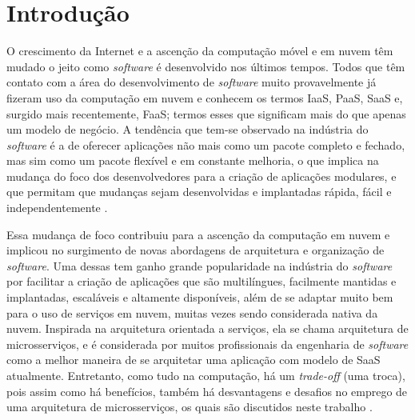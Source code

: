 \chapter{Introdução}\label{chapter-introducao}

O crescimento da Internet e a ascenção da computação móvel e em nuvem têm mudado o jeito como \emph{software} é desenvolvido nos últimos tempos. Todos que têm contato com a área do desenvolvimento de \emph{software} muito provavelmente já fizeram uso da computação em nuvem e conhecem os termos IaaS, PaaS, SaaS e, surgido mais recentemente, FaaS; termos esses que significam mais do que apenas um modelo de negócio. A tendência que tem-se observado na indústria do \emph{software} é a de oferecer aplicações não mais como um pacote completo e fechado, mas sim como um pacote flexível e em constante melhoria, o que implica na mudança do foco dos desenvolvedores para a criação de aplicações modulares, e que permitam que mudanças sejam desenvolvidas e implantadas rápida, fácil e independentemente \cite{CAOPLE, oracle_microservices}.

Essa mudança de foco contribuiu para a ascenção da computação em nuvem e implicou no surgimento de novas abordagens de arquitetura e organização de \emph{software}. Uma dessas tem ganho grande popularidade na indústria do \emph{software} por facilitar a criação de aplicações que são multilíngues, facilmente mantidas e implantadas, escaláveis e altamente disponíveis, além de se adaptar muito bem para o uso de serviços em nuvem, muitas vezes sendo considerada nativa da nuvem. Inspirada na arquitetura orientada a serviços, ela se chama arquitetura de microsserviços, e é considerada por muitos profissionais da engenharia de \emph{software} como a melhor maneira de se arquitetar uma aplicação com modelo de SaaS atualmente. Entretanto, como tudo na computação, há um \emph{trade-off} (uma troca), pois assim como há benefícios, também há desvantagens e desafios no emprego de uma arquitetura de microsserviços, os quais são discutidos neste trabalho \cite{middleware-microservices,design-monitoring-testing-waseem}.



